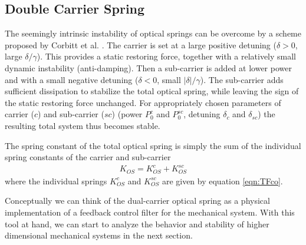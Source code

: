 \subsection{Double Carrier Spring}

The seemingly intrinsic instability of optical springs can be overcome by a scheme 
proposed by Corbitt et al. \cite{Corbitt07}. The carrier is set at a large positive detuning ($\delta>0$, large $\delta/\gamma$). This provides a static restoring force, together with a relatively small dynamic instability (anti-damping). Then a sub-carrier is added at lower power and with a small negative detuning ($\delta<0$, small $|\delta|/\gamma$). The sub-carrier adds sufficient dissipation to stabilize the total optical spring, while leaving the sign of the static restoring force unchanged.
For appropriately chosen parameters of carrier ($c$) and sub-carrier ($sc$) (power $P_0^c$ and $P_0^{sc}$, detuning  $\delta_c$ and $\delta_{sc}$) the resulting total system thus becomes stable.

The spring constant of the total optical spring is simply the sum of the individual spring constants of the carrier and sub-carrier
\begin{eqnarray}
\label{eqn:KOSsum}
K_{OS}=K_{OS}^c+K_{OS}^{sc}
\end{eqnarray}
where the individual springs $K_{OS}^c$ and $K_{OS}^{sc}$ are given by equation \ref{eqn:TFco}.


Conceptually we can think of the dual-carrier optical spring as a physical implementation of a feedback control filter for the mechanical system. With this tool at hand, we can start to analyze the behavior and stability of higher dimensional mechanical systems in the next section.



